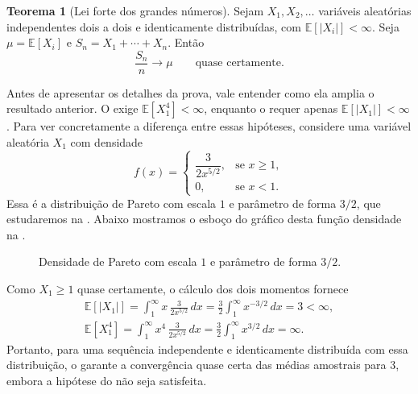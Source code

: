 \documentclass[12pt,portuguese]{article}
\theoremstyle{definition}
\newtheorem{theorem}{Teorema}
\theoremstyle{plainexercise}
\theoremstyle{starredexercise}
\theoremstyle{definition}
\begin{document}
\begin{theorem}[Lei forte dos grandes números]\label{thm:lei-forte}
Sejam $X_1,X_2,\ldots$ variáveis aleatórias independentes dois a dois e
identicamente distribuídas, com $\mathbb{E}[|X_i|]<\infty$. Seja
$\mu=\mathbb{E}[X_i]$ e $S_n=X_1+\cdots+X_n$. Então
\[
\frac{S_n}{n}\longrightarrow\mu
\qquad\text{quase certamente.}
\]
\end{theorem}

Antes de apresentar os detalhes da prova, vale entender como ela amplia o
resultado anterior. O  exige
$\mathbb{E}[X_1^4]<\infty$, enquanto o  requer apenas
$\mathbb{E}[|X_1|]<\infty$. Para ver concretamente a diferença entre essas
hipóteses, considere uma variável aleatória $X_1$ com densidade
\[
f(x)=\begin{cases}
\dfrac{3}{2x^{5/2}},&\text{se }x\geqslant1,\\[0.5cm]
0,&\text{se }x<1.
\end{cases}
\]
Essa é a distribuição de Pareto com escala $1$ e parâmetro de forma $3/2$,
que estudaremos na . Abaixo mostramos o esboço do gráfico desta função densidade na
.

\begin{figure}[H]
\centering
{}
\caption{Densidade de Pareto com escala $1$ e parâmetro de forma $3/2$.}
\label{fig:densidade-pareto-exemplo}
\end{figure}

Como $X_1\geqslant1$ quase certamente,
o cálculo dos dois momentos fornece
\begin{gather*}
\mathbb{E}[|X_1|]
=\int_1^{\infty}x\,\frac{3}{2x^{5/2}}\,dx
=\frac{3}{2}\int_1^{\infty}x^{-3/2}\,dx=3<\infty,\\[0.4cm]
\mathbb{E}[X_1^4]
=\int_1^{\infty}x^4\,\frac{3}{2x^{5/2}}\,dx
=\frac{3}{2}\int_1^{\infty}x^{3/2}\,dx=\infty.
\end{gather*}
Portanto, para uma sequência independente e identicamente distribuída com
essa distribuição, o  garante a convergência quase certa
das médias amostrais para $3$, embora a hipótese do
 não seja satisfeita.
\end{document}
